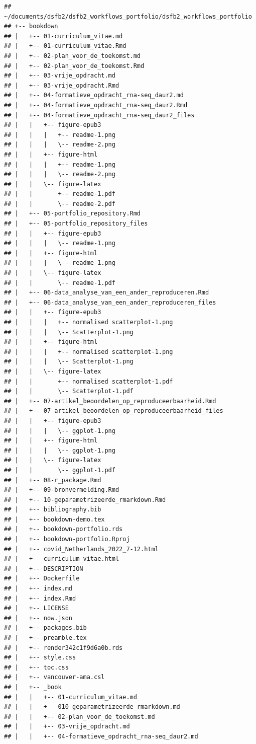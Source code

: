\documentclass[
]{book}
\begin{document}
\begin{verbatim}
## ~/documents/dsfb2/dsfb2_workflows_portfolio/dsfb2_workflows_portfolio
## +-- bookdown
## |   +-- 01-curriculum_vitae.md
## |   +-- 01-curriculum_vitae.Rmd
## |   +-- 02-plan_voor_de_toekomst.md
## |   +-- 02-plan_voor_de_toekomst.Rmd
## |   +-- 03-vrije_opdracht.md
## |   +-- 03-vrije_opdracht.Rmd
## |   +-- 04-formatieve_opdracht_rna-seq_daur2.md
## |   +-- 04-formatieve_opdracht_rna-seq_daur2.Rmd
## |   +-- 04-formatieve_opdracht_rna-seq_daur2_files
## |   |   +-- figure-epub3
## |   |   |   +-- readme-1.png
## |   |   |   \-- readme-2.png
## |   |   +-- figure-html
## |   |   |   +-- readme-1.png
## |   |   |   \-- readme-2.png
## |   |   \-- figure-latex
## |   |       +-- readme-1.pdf
## |   |       \-- readme-2.pdf
## |   +-- 05-portfolio_repository.Rmd
## |   +-- 05-portfolio_repository_files
## |   |   +-- figure-epub3
## |   |   |   \-- readme-1.png
## |   |   +-- figure-html
## |   |   |   \-- readme-1.png
## |   |   \-- figure-latex
## |   |       \-- readme-1.pdf
## |   +-- 06-data_analyse_van_een_ander_reproduceren.Rmd
## |   +-- 06-data_analyse_van_een_ander_reproduceren_files
## |   |   +-- figure-epub3
## |   |   |   +-- normalised scatterplot-1.png
## |   |   |   \-- Scatterplot-1.png
## |   |   +-- figure-html
## |   |   |   +-- normalised scatterplot-1.png
## |   |   |   \-- Scatterplot-1.png
## |   |   \-- figure-latex
## |   |       +-- normalised scatterplot-1.pdf
## |   |       \-- Scatterplot-1.pdf
## |   +-- 07-artikel_beoordelen_op_reproduceerbaarheid.Rmd
## |   +-- 07-artikel_beoordelen_op_reproduceerbaarheid_files
## |   |   +-- figure-epub3
## |   |   |   \-- ggplot-1.png
## |   |   +-- figure-html
## |   |   |   \-- ggplot-1.png
## |   |   \-- figure-latex
## |   |       \-- ggplot-1.pdf
## |   +-- 08-r_package.Rmd
## |   +-- 09-bronvermelding.Rmd
## |   +-- 10-geparametrizeerde_rmarkdown.Rmd
## |   +-- bibliography.bib
## |   +-- bookdown-demo.tex
## |   +-- bookdown-portfolio.rds
## |   +-- bookdown-portfolio.Rproj
## |   +-- covid_Netherlands_2022_7-12.html
## |   +-- curriculum_vitae.html
## |   +-- DESCRIPTION
## |   +-- Dockerfile
## |   +-- index.md
## |   +-- index.Rmd
## |   +-- LICENSE
## |   +-- now.json
## |   +-- packages.bib
## |   +-- preamble.tex
## |   +-- render342c1f9d6a0b.rds
## |   +-- style.css
## |   +-- toc.css
## |   +-- vancouver-ama.csl
## |   +-- _book
## |   |   +-- 01-curriculum_vitae.md
## |   |   +-- 010-geparametrizeerde_rmarkdown.md
## |   |   +-- 02-plan_voor_de_toekomst.md
## |   |   +-- 03-vrije_opdracht.md
## |   |   +-- 04-formatieve_opdracht_rna-seq_daur2.md

\end{verbatim}
\end{document}

